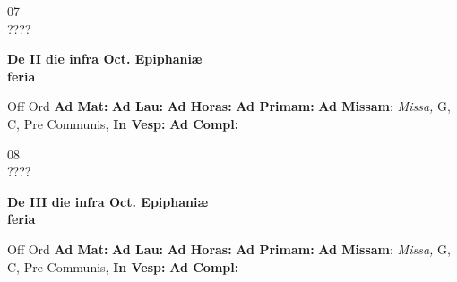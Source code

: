 \documentclass[10pt, openany]{book}
\begin{document}
    \begin{center}
        \begin{minipage}{3.5in}
            \vspace{2em}
            \begin{minipage}{0.5in}
                {\Huge 07} \\
                {\normalsize ????}
            \end{minipage}
            \begin{minipage}{3.0in}
                \textbf{ \large De II die infra Oct. Epiphaniæ \\
                \textnormal{\normalsize feria}}

            \end{minipage}
            \begin{justify}Off Ord
                \textbf{Ad Mat: }
                \textbf{Ad Lau: }
                \textbf{Ad Horas: }
                \textbf{Ad Primam: }\textbf{Ad Missam}: \textit{Missa,} G, C, Pre Communis, 
                \textbf{In Vesp: }
                \textbf{Ad Compl: }
            \end{justify}
        \end{minipage}
    \end{center}

    \begin{center}
        \begin{minipage}{3.5in}
            \vspace{2em}
            \begin{minipage}{0.5in}
                {\Huge 08} \\
                {\normalsize ????}
            \end{minipage}
            \begin{minipage}{3.0in}
                \textbf{ \large De III die infra Oct. Epiphaniæ \\
                \textnormal{\normalsize feria}}

            \end{minipage}
            \begin{justify}Off Ord
                \textbf{Ad Mat: }
                \textbf{Ad Lau: }
                \textbf{Ad Horas: }
                \textbf{Ad Primam: }\textbf{Ad Missam}: \textit{Missa,} G, C, Pre Communis, 
                \textbf{In Vesp: }
                \textbf{Ad Compl: }
            \end{justify}
        \end{minipage}
    \end{center}
\end{document}
